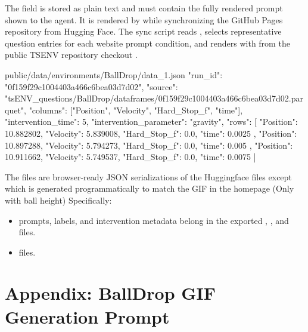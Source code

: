 \documentclass[11pt]{article}
\begin{document}
The  field is stored as plain text and must contain the fully rendered prompt shown to the agent.
It is rendered by  while synchronizing the GitHub Pages repository from Hugging Face.
The sync script reads , selects representative question entries for each website prompt condition, and renders  with  from the public TSENV repository checkout .

\label{sec:website-environment-data-json}
\begin{DocCode}
public/data/environments/BallDrop/data_1.json
{
  "run_id": "0f159f29c1004403a466c6bea03d7d02",
  "source": "tsENV_questions/BallDrop/dataframes/0f159f29c1004403a466c6bea03d7d02.parquet",
  "columns": ["Position", "Velocity", "Hard_Stop_f", "time"],
  "intervention_time": 5,
  "intervention_parameter": "gravity",
  "rows": [
    {
      "Position": 10.882802,
      "Velocity": 5.839008,
      "Hard_Stop_f": 0.0,
      "time": 0.0025
    },
    {
      "Position": 10.897288,
      "Velocity": 5.794273,
      "Hard_Stop_f": 0.0,
      "time": 0.005
    },
    {
      "Position": 10.911662,
      "Velocity": 5.749537,
      "Hard_Stop_f": 0.0,
      "time": 0.0075
    }
  ]
}
\end{DocCode}
The  files are browser-ready JSON serializations of the Huggingface files except  which is generated programmatically to match the GIF in the homepage (Only with ball height)
Specifically:
\begin{itemize}
  \item prompts, labels, and intervention metadata belong in the exported , , and  files.
  \item {} files.
\end{itemize}

\appendix
{}\label{sec:website-ball-drop-gif-prompt}
\section*{Appendix: BallDrop GIF Generation Prompt}
\end{document}
